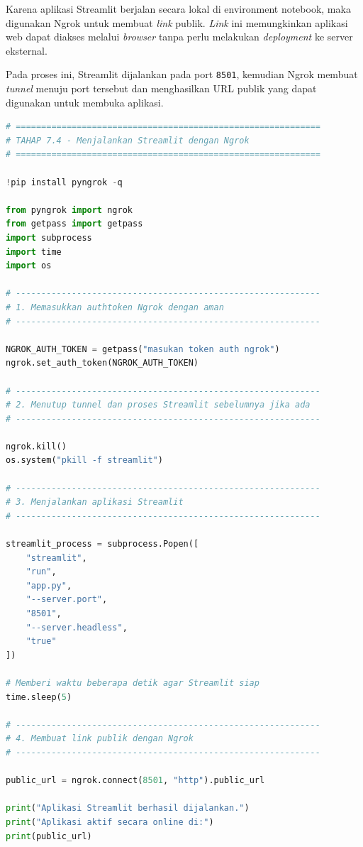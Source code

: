 Karena aplikasi Streamlit berjalan secara lokal di environment notebook, maka digunakan Ngrok untuk membuat \textit{link} publik. \textit{Link} ini memungkinkan aplikasi web dapat diakses melalui \textit{browser} tanpa perlu melakukan \textit{deployment} ke server eksternal.

Pada proses ini, Streamlit dijalankan pada port \texttt{8501}, kemudian Ngrok membuat \textit{tunnel} menuju port tersebut dan menghasilkan URL publik yang dapat digunakan untuk membuka aplikasi.

\begin{lstlisting}[language=Python, caption=Menjalankan Streamlit dengan Ngrok]
# ============================================================
# TAHAP 7.4 - Menjalankan Streamlit dengan Ngrok
# ============================================================

!pip install pyngrok -q

from pyngrok import ngrok
from getpass import getpass
import subprocess
import time
import os

# ------------------------------------------------------------
# 1. Memasukkan authtoken Ngrok dengan aman
# ------------------------------------------------------------

NGROK_AUTH_TOKEN = getpass("masukan token auth ngrok")
ngrok.set_auth_token(NGROK_AUTH_TOKEN)

# ------------------------------------------------------------
# 2. Menutup tunnel dan proses Streamlit sebelumnya jika ada
# ------------------------------------------------------------

ngrok.kill()
os.system("pkill -f streamlit")

# ------------------------------------------------------------
# 3. Menjalankan aplikasi Streamlit
# ------------------------------------------------------------

streamlit_process = subprocess.Popen([
    "streamlit",
    "run",
    "app.py",
    "--server.port",
    "8501",
    "--server.headless",
    "true"
])

# Memberi waktu beberapa detik agar Streamlit siap
time.sleep(5)

# ------------------------------------------------------------
# 4. Membuat link publik dengan Ngrok
# ------------------------------------------------------------

public_url = ngrok.connect(8501, "http").public_url

print("Aplikasi Streamlit berhasil dijalankan.")
print("Aplikasi aktif secara online di:")
print(public_url)
\end{lstlisting}

